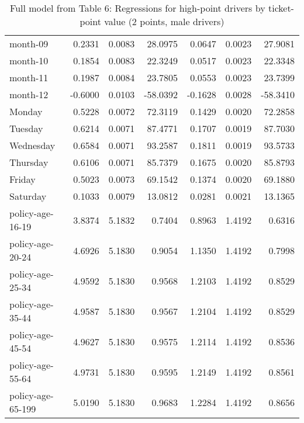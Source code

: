 \documentclass[10pt]{article}
\begin{document}
\begin{table}[ht]
\begin{tabular}{lrrrrrr}
  month-09 & 0.2331 & 0.0083 & 28.0975 & 0.0647 & 0.0023 & 27.9081 \\ 
  month-10 & 0.1854 & 0.0083 & 22.3249 & 0.0517 & 0.0023 & 22.3348 \\ 
  month-11 & 0.1987 & 0.0084 & 23.7805 & 0.0553 & 0.0023 & 23.7399 \\ 
  month-12 & -0.6000 & 0.0103 & -58.0392 & -0.1628 & 0.0028 & -58.3410 \\ 
  Monday & 0.5228 & 0.0072 & 72.3119 & 0.1429 & 0.0020 & 72.2858 \\ 
  Tuesday & 0.6214 & 0.0071 & 87.4771 & 0.1707 & 0.0019 & 87.7030 \\ 
  Wednesday & 0.6584 & 0.0071 & 93.2587 & 0.1811 & 0.0019 & 93.5733 \\ 
  Thursday & 0.6106 & 0.0071 & 85.7379 & 0.1675 & 0.0020 & 85.8793 \\ 
  Friday & 0.5023 & 0.0073 & 69.1542 & 0.1374 & 0.0020 & 69.1880 \\ 
  Saturday & 0.1033 & 0.0079 & 13.0812 & 0.0281 & 0.0021 & 13.1365 \\ 
  policy-age-16-19 & 3.8374 & 5.1832 & 0.7404 & 0.8963 & 1.4192 & 0.6316 \\ 
  policy-age-20-24 & 4.6926 & 5.1830 & 0.9054 & 1.1350 & 1.4192 & 0.7998 \\ 
  policy-age-25-34 & 4.9592 & 5.1830 & 0.9568 & 1.2103 & 1.4192 & 0.8529 \\ 
  policy-age-35-44 & 4.9587 & 5.1830 & 0.9567 & 1.2104 & 1.4192 & 0.8529 \\ 
  policy-age-45-54 & 4.9627 & 5.1830 & 0.9575 & 1.2114 & 1.4192 & 0.8536 \\ 
  policy-age-55-64 & 4.9731 & 5.1830 & 0.9595 & 1.2149 & 1.4192 & 0.8561 \\ 
  policy-age-65-199 & 5.0190 & 5.1830 & 0.9683 & 1.2284 & 1.4192 & 0.8656 \\ 
   \hline
\end{tabular}
\caption{Full model from Table 6: Regressions for high-point drivers by ticket-point value (2 points, male drivers)} 
\label{tab_6_2_pts_M}
\end{table}


\clearpage
\pagebreak



\end{document}
